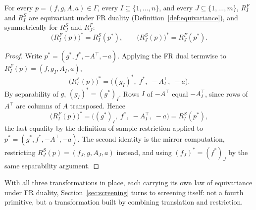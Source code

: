 \begin{proposition}
\label{prop:restriction-equivariance}
For every \(p=(f,g,A,a)\in\Gamma\), every \(I\subseteq\{1,\ldots,n\}\),
and every \(J\subseteq\{1,\ldots,m\}\), \(R^F_I\) and \(R^S_I\) are
equivariant under FR duality (Definition~\ref{def:equivariance}), and
symmetrically for \(R^S_J\) and \(R^F_J\):
\[
\bigl(R^{F}_I(p)\bigr)^*=R^{S}_I(p^*),
\qquad
\bigl(R^{S}_J(p)\bigr)^*=R^{F}_J(p^*).
\]
\end{proposition}

\begin{proof}
Write \(p^*=(g^*,f^*,-A^\top,-a)\). Applying the FR dual termwise to
\(R^F_I(p)=(f,g_I,A_I,a)\),
\[
\bigl(R^F_I(p)\bigr)^*
=
\bigl((g_I)^*,\;f^*,\;-A_I^\top,\;-a\bigr).
\]
By separability of \(g\), \((g_I)^*=(g^*)_I\). Rows \(I\) of
\(-A^\top\) equal \(-A_I^\top\), since rows of \(A^\top\) are columns of
\(A\) transposed. Hence
\[
\bigl(R^F_I(p)\bigr)^*
=
\bigl((g^*)_I,\;f^*,\;-A_I^\top,\;-a\bigr)
=
R^S_I(p^*),
\]
the last equality by the definition of sample restriction applied to
\(p^*=(g^*,f^*,-A^\top,-a)\). The second identity is the mirror
computation, restricting \(R^S_J(p)=(f_J,g,A_J,a)\) instead, and using
\((f_J)^*=(f^*)_J\) by the same separability argument.
\end{proof}

 

With all three transformations in place, each carrying its own law of
equivariance under FR duality, Section~\ref{sec:screening} turns to
screening itself: not a fourth primitive, but a transformation built by
combining translation and restriction.
